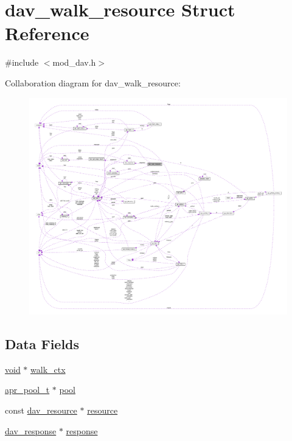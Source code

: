 \hypertarget{structdav__walk__resource}{}\section{dav\+\_\+walk\+\_\+resource Struct Reference}
\label{structdav__walk__resource}


{\ttfamily \#include $<$mod\+\_\+dav.\+h$>$}



Collaboration diagram for dav\+\_\+walk\+\_\+resource\+:
\nopagebreak
\begin{figure}[H]
\begin{center}
\leavevmode
\includegraphics[width=350pt]{structdav__walk__resource__coll__graph}
\end{center}
\end{figure}
\subsection*{Data Fields}
\begin{DoxyCompactItemize}
\item 
\hyperlink{group__MOD__ISAPI_gacd6cdbf73df3d9eed42fa493d9b621a6}{void} $\ast$ \hyperlink{structdav__walk__resource_aa34c3e02290f19435b455136d2d90720}{walk\+\_\+ctx}
\item 
\hyperlink{structapr__pool__t}{apr\+\_\+pool\+\_\+t} $\ast$ \hyperlink{structdav__walk__resource_a6ed413a33aea84076935230a22fd023a}{pool}
\item 
const \hyperlink{structdav__resource}{dav\+\_\+resource} $\ast$ \hyperlink{structdav__walk__resource_a6465f355fb5235ed70cd5a0c82e4f2de}{resource}
\item 
\hyperlink{structdav__response}{dav\+\_\+response} $\ast$ \hyperlink{structdav__walk__resource_a3c28cb22a7eae9cbe00fd6916a690407}{response}
\end{DoxyCompactItemize}


